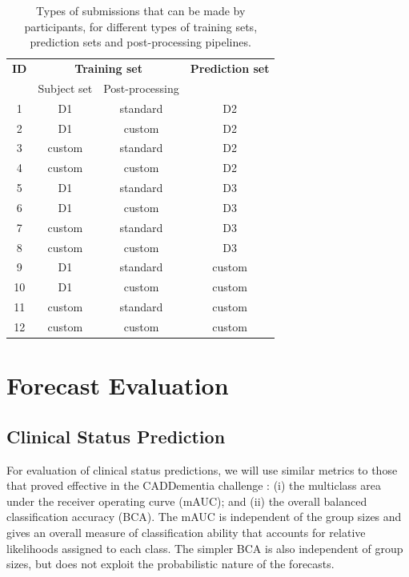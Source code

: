 \begin{table}[h]
\centering
 \begin{tabular}{c | c | c | c}
\textbf{ID} & \multicolumn{2}{c|}{\textbf{Training set}} & \textbf{Prediction set}\\
& Subject set & Post-processing & \\
\hline
1 & D1 & standard & D2\\
2 & D1 & custom & D2\\
3 & custom & standard & D2\\
4 & custom & custom & D2\\
5 & D1 & standard & D3\\
6 & D1 & custom & D3\\
7 & custom & standard & D3\\
8 & custom & custom & D3\\
9 & D1 & standard & custom\\
10 & D1 & custom & custom\\
11 & custom & standard & custom\\
12 & custom & custom & custom\\
  
\end{tabular}
\caption[Types of TADPOLE submissions that can be made by participants.]{Types of submissions that can be made by participants, for different types of training sets, prediction sets and post-processing pipelines.}
\label{tab:submissions}
\end{table}


\section{Forecast Evaluation}
\subsection{Clinical Status Prediction}

For evaluation of clinical status predictions, we will use similar metrics to those that proved effective in the CADDementia challenge \cite{bron2015standardized}: (i) the multiclass area under the receiver operating curve (mAUC); and (ii) the overall balanced classification accuracy (BCA). The mAUC is independent of the group sizes and gives an overall measure of classification ability that accounts for relative likelihoods assigned to each class. The simpler BCA is also independent of group sizes, but does not exploit the probabilistic nature of the forecasts. 

